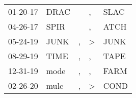 \begin{supertabular}{p{0.07\textwidth}p{0.06\textwidth}p{0.02\textwidth}p{0.02\textwidth}p{0.06\textwidth}}
          01-20-17\textsuperscript{} &           DRAC\textsuperscript{} &                  &             , &           SLAC\textsuperscript{} \\
          04-26-17\textsuperscript{} &           SPIR\textsuperscript{} &                  &             , &           ATCH\textsuperscript{} \\
          05-24-19\textsuperscript{} &           JUNK\textsuperscript{} &                , &  \textgreater &           JUNK\textsuperscript{} \\
          08-29-19\textsuperscript{} &           TIME\textsuperscript{} &                , &             , &           TAPE\textsuperscript{} \\
          12-31-19\textsuperscript{} &           mode\textsuperscript{} &                , &             , &           FARM\textsuperscript{} \\
          02-26-20\textsuperscript{} &           mulc\textsuperscript{} &                , &  \textgreater &           COND\textsuperscript{} \\
\end{supertabular}
